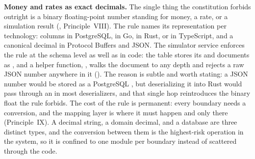 \textbf{Money and rates as exact decimals.} The single thing the constitution
forbids outright is a binary floating-point number standing for money, a rate,
or a simulation result (,
Principle~VIII). The rule names its representation per technology:
 columns in PostgreSQL,  in Go,
 in Rust,  or  in TypeScript,
and a canonical decimal  in Protocol Buffers and JSON. The
simulator service enforces the rule at the schema level as well as in code: the
 table stores its  and  documents as
, and a helper function, , walks the
document to any depth and rejects a raw JSON number anywhere in it
().
The reason is subtle and worth stating: a JSON number would be stored as a
PostgreSQL , but deserializing it into Rust would pass through an
 in most deserializers, and that single hop reintroduces the binary
float the rule forbids. The cost of the rule is permanent: every boundary needs
a conversion, and the mapping layer is where it must happen and only there
(Principle~IX). A decimal string, a domain decimal, and a database 
are three distinct types, and the conversion between them is the highest-risk
operation in the system, so it is confined to one module per boundary instead of
scattered through the code.

